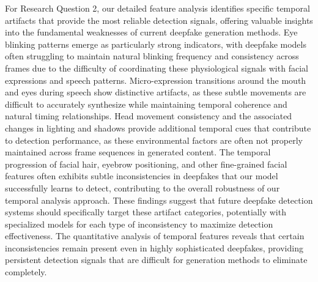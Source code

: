 \documentclass[conference]{IEEEtran}
\begin{document}
For Research Question 2, our detailed feature analysis identifies specific temporal artifacts that provide the most reliable detection signals, offering valuable insights into the fundamental weaknesses of current deepfake generation methods.
Eye blinking patterns emerge as particularly strong indicators, with deepfake models often struggling to maintain natural blinking frequency and consistency across frames due to the difficulty of coordinating these physiological signals with facial expressions and speech patterns.
Micro-expression transitions around the mouth and eyes during speech show distinctive artifacts, as these subtle movements are difficult to accurately synthesize while maintaining temporal coherence and natural timing relationships.
Head movement consistency and the associated changes in lighting and shadows provide additional temporal cues that contribute to detection performance, as these environmental factors are often not properly maintained across frame sequences in generated content.
The temporal progression of facial hair, eyebrow positioning, and other fine-grained facial features often exhibits subtle inconsistencies in deepfakes that our model successfully learns to detect, contributing to the overall robustness of our temporal analysis approach.
These findings suggest that future deepfake detection systems should specifically target these artifact categories, potentially with specialized models for each type of inconsistency to maximize detection effectiveness.
The quantitative analysis of temporal features reveals that certain inconsistencies remain present even in highly sophisticated deepfakes, providing persistent detection signals that are difficult for generation methods to eliminate completely.
\end{document}
